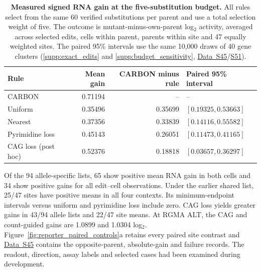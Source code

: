 \documentclass[11pt,a4paper]{article}
\newcommand{\tableid}[1]{\setcounter{table}{\numexpr#1-1\relax}}
\newcommand{\sr}[1]{\ref{#1}}
\newcommand{\data}[1]{\hyperref[data:S#1]{Data~S#1}}
\newcommand{\sdata}[1]{\hyperref[data:S#1]{S#1}}
\begin{document}
\tableid{27}
\begin{table}[H]\centering\small
\caption{\textbf{Measured signed RNA gain at the five-substitution budget.}
All rules select from the same 60 verified substitutions per parent and use a total selection weight of five. The outcome is mutant-minus-own-parent log$_2$ activity, averaged across selected edits, cells within parent, parents within site and 47 equally weighted sites. The paired 95\% intervals use the same 10,000 draws of 40 gene clusters (\sr{supp:exact_edits} and \sr{supp:budget_sensitivity}, \data{45}/\sdata{51}).}
\label{tab:five-edit-gain}
\begin{tabular}{@{}lrrl@{}}
\toprule
Rule & Mean gain & CARBON minus rule & Paired 95\% interval \\
\midrule
CARBON & 0.71194 & -- & -- \\
Uniform & 0.35496 & 0.35699 & $[0.19325,0.53663]$ \\
Nearest & 0.37356 & 0.33839 & $[0.14116,0.55582]$ \\
Pyrimidine loss & 0.45143 & 0.26051 & $[0.11473,0.41165]$ \\
CAG loss (post hoc) & 0.52376 & 0.18818 & $[0.03657,0.36297]$ \\
\bottomrule
\end{tabular}
\end{table}

Of the 94 allele-specific lists, 65 show positive mean RNA gain in both cells and 34 show positive gains for all edit--cell observations. Under the earlier shared list, 25/47 sites have positive means in all four contexts. Its minimum-endpoint intervals versus uniform and pyrimidine loss include zero. CAG loss yields greater gains in 43/94 allele lists and 22/47 site means. At RGMA ALT, the CAG and count-guided gains are 1.0899 and 1.0304 log$_2$. Figure~\ref{fig:reporter_paired_controls}a retains every paired site contrast and \data{45} contains the opposite-parent, absolute-gain and failure records. The readout, direction, assay labels and selected cases had been examined during development.
\end{document}
